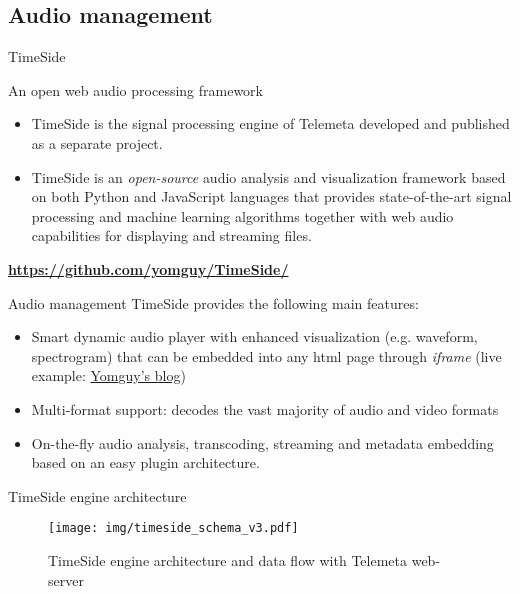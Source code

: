 \documentclass[final, hyperref, table]{beamer}
\begin{document}
\subsection{Audio management}
\begin{frame}{TimeSide}\scriptsize
 \begin{block}{An open web audio processing framework}
   \begin{itemize}
   \item TimeSide is the \alert{signal processing engine} of Telemeta developed and published as a separate project.
   \item TimeSide is an
     \emph{open-source} \alert{audio analysis and visualization framework} based on
     both \alert{Python} and \alert{JavaScript} languages that provides
     state-of-the-art signal processing and machine learning
     algorithms together with \alert{web audio} capabilities for displaying
     and streaming files.
   \end{itemize}
\vspace{-0.5cm}\begin{center}
  \colorbox{yellow!40}{\bf \url{https://github.com/yomguy/TimeSide/} }
\end{center}
\end{block}
\begin{block}{Audio management}
  TimeSide provides the following main features:
  \begin{itemize}
   \item Smart dynamic audio player with enhanced visualization (e.g. waveform,
    spectrogram) that can be embedded into any html page through \emph{iframe} (live example: \href{http://yomix.org/telemeta-1-embedded-timeside-player.html}{Yomguy's blog})
  \item Multi-format support: decodes the vast majority of audio and
    video formats%
  \item On-the-fly audio analysis, transcoding, streaming and metadata embedding
    based on an easy plugin architecture.
  \end{itemize}
\end{block}

 
\end{frame} 

\begin{frame}{TimeSide engine architecture}
  \begin{figure}[htbp]
  \centering
  \texttt{[image: img/timeside\_schema\_v3.pdf]}
  \caption{TimeSide engine architecture and data flow with Telemeta web-server}\label{fig:TimeSide_Archi}
\end{figure}
\end{frame}
  
\end{document}

